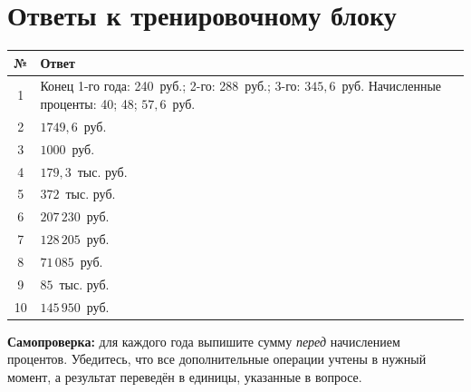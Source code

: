\documentclass[a4paper,12pt]{article}
\newcommand{\answer}[2]{#1 & #2 \\}
\begin{document}
\clearpage
\section*{Ответы к тренировочному блоку}
\begin{center}
\renewcommand{\arraystretch}{1.55}
\begin{tabularx}{.95\linewidth}{@{}cX@{}}
\toprule
\textbf{№} & \textbf{Ответ}\\
\midrule
\answer{1}{Конец 1-го года: 240~руб.; 2-го: 288~руб.; 3-го: \(345{,}6\)~руб. Начисленные проценты: 40; 48; \(57{,}6\)~руб.}
\answer{2}{\(1749{,}6\)~руб.}
\answer{3}{\(1000\)~руб.}
\answer{4}{\(179{,}3\)~тыс. руб.}
\answer{5}{\(372\)~тыс. руб.}
\answer{6}{\(207\,230\)~руб.}
\answer{7}{\(128\,205\)~руб.}
\answer{8}{\(71\,085\)~руб.}
\answer{9}{\(85\)~тыс. руб.}
\answer{10}{\(145\,950\)~руб.}
\bottomrule
\end{tabularx}
\end{center}
\vspace{6mm}
\textbf{Самопроверка:} для каждого года выпишите сумму \emph{перед} начислением процентов. Убедитесь, что все дополнительные операции учтены в нужный момент, а результат переведён в единицы, указанные в вопросе.
\end{document}
